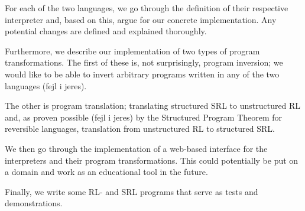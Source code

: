 For each of the two languages, we go through the definition of their respective interpreter and, based on this, argue for our concrete implementation. Any potential changes are defined and explained thoroughly. 

Furthermore, we describe our implementation of two types of program transformations. The first of these is, not surprisingly, program inversion; we would like to be able to invert arbitrary programs written in any of the two languages (fejl i jeres).

The other is program translation; translating structured SRL to unstructured RL and, as proven possible (fejl i jeres) by the Structured Program Theorem for reversible languages, translation from unstructured RL to structured SRL.

We then go through the implementation of a web-based interface for the interpreters and their program transformations. This could potentially be put on a domain and work as an educational tool in the future. 

Finally, we write some RL- and SRL programs that serve as tests and demonstrations. 
